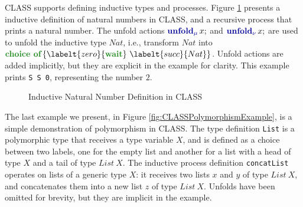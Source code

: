 CLASS supports defining inductive types and processes. Figure \ref{fig:CLASSNatExample} presents a inductive definition of natural numbers in CLASS, and a recursive process that prints a natural number. The unfold actions $\unfoldmuc{x}$ and $\unfoldnuc{x}$ are used to unfold the inductive type $Nat$, i.e., transform $Nat$ into $\choicet{\labelt{zero}{\waitt}\ \labelt{succ}{Nat}}$. Unfold actions are added implicitly, but they are explicit in the example for clarity. This example prints \texttt{S S 0}, representing the number $2$.

\begin{figure}[H]
    \centering
    \begin{minipage}{0.45\textwidth}
        \begin{class}
            \z\z
        \end{class}
    \end{minipage}
    \hfill
    \begin{minipage}{0.45\textwidth}
        \begin{class}
        \end{class}
    \end{minipage}
    \caption{Inductive Natural Number Definition in CLASS}
    \label{fig:CLASSNatExample}
\end{figure}

The last example we present, in Figure \ref{fig:CLASSPolymorphismExample}, is a simple demonstration of polymorphism in CLASS. The type definition \texttt{List} is a polymorphic type that receives a type variable $X$, and is defined as a choice between two labels, one for the empty list and another for a list with a head of type $X$ and a tail of type $List\ X$. The inductive process definition \texttt{concatList} operates on lists of a generic type $X$: it receives two lists $x$ and $y$ of type $List\ X$, and concatenates them into a new list $z$ of type $List\ X$. Unfolds have been omitted for brevity, but they are implicit in the example.

